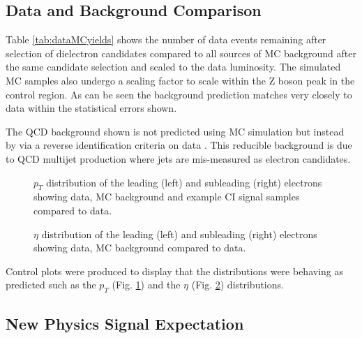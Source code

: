\newpage
\subsection{Data and Background Comparison}
Table \ref{tab:dataMCyields} shows the number of data events remaining after selection of dielectron candidates compared to all sources of MC background after the same candidate selection and scaled to the data luminosity.  The simulated MC samples also undergo a scaling factor to scale within the Z boson peak in the control region. As can be seen the background prediction matches very closely to data within the statistical errors shown.

The QCD background shown is not predicted using MC simulation but instead by via a reverse identification criteria on data \cite{QCD}. This reducible background is due to QCD multijet production where jets are mis-measured as electron candidates.



\begin{figure}[h!]
\centering
\caption{$p_{T}$ distribution of the leading (left) and subleading (right) electrons showing data, MC background and example CI signal samples compared to data.}
\label{fig:CIpT}
\end{figure}

\begin{figure}[h!]
\centering
\caption{$\eta$ distribution of the leading (left) and subleading (right) electrons showing data, MC background compared to data.}
\label{fig:eta}
\end{figure}

Control plots were produced to display that the distributions were behaving as predicted such as the $p_{T}$ (Fig. \ref{fig:CIpT}) and the $\eta$ (Fig. \ref{fig:eta}) distributions.





\subsection{New Physics Signal Expectation}

